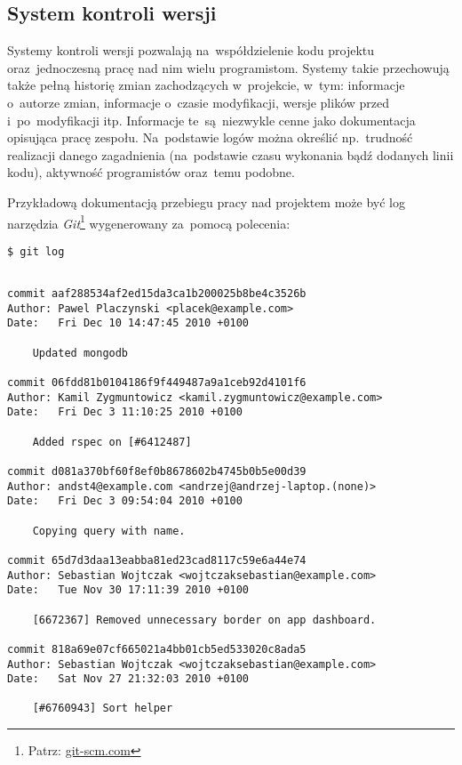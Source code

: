 \subsection{System kontroli wersji} \label{dokumentacja.git}

Systemy kontroli wersji pozwalają na~współdzielenie kodu projektu oraz~jednoczesną pracę nad nim wielu programistom. Systemy takie przechowują także pełną historię zmian zachodzących w~projekcie, w~tym: informacje o~autorze zmian, informacje o~czasie modyfikacji, wersje plików przed i~po~modyfikacji itp. Informacje te~są~niezwykle cenne jako dokumentacja opisująca pracę zespołu. Na~podstawie logów można określić np.~trudność realizacji danego zagadnienia (na~podstawie czasu wykonania bądź dodanych linii kodu), aktywność programistów oraz~temu podobne.


Przykładową dokumentacją przebiegu pracy nad projektem może być log narzędzia \textit{Git}\footnote{Patrz: \url{git-scm.com}} wygenerowany za~pomocą polecenia:

\mbox{\texttt{\$ git log}}

  \begin{lstlisting}

commit aaf288534af2ed15da3ca1b200025b8be4c3526b
Author: Pawel Placzynski <placek@example.com>
Date:   Fri Dec 10 14:47:45 2010 +0100

    Updated mongodb

commit 06fdd81b0104186f9f449487a9a1ceb92d4101f6
Author: Kamil Zygmuntowicz <kamil.zygmuntowicz@example.com>
Date:   Fri Dec 3 11:10:25 2010 +0100

    Added rspec on [#6412487]

commit d081a370bf60f8ef0b8678602b4745b0b5e00d39
Author: andst4@example.com <andrzej@andrzej-laptop.(none)>
Date:   Fri Dec 3 09:54:04 2010 +0100

    Copying query with name.

commit 65d7d3daa13eabba81ed23cad8117c59e6a44e74
Author: Sebastian Wojtczak <wojtczaksebastian@example.com>
Date:   Tue Nov 30 17:11:39 2010 +0100

    [6672367] Removed unnecessary border on app dashboard.

commit 818a69e07cf665021a4bb01cb5ed533020c8ada5
Author: Sebastian Wojtczak <wojtczaksebastian@example.com>
Date:   Sat Nov 27 21:32:03 2010 +0100

    [#6760943] Sort helper

  \end{lstlisting}

